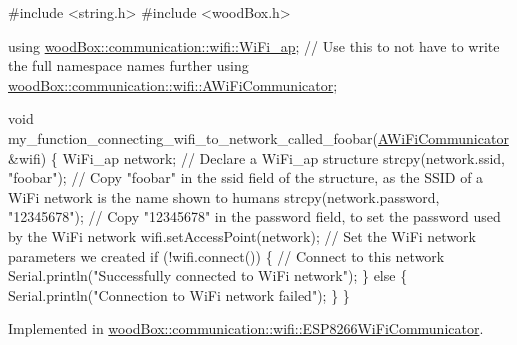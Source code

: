 \begin{DoxyCode}
\textcolor{preprocessor}{#include <string.h>}
\textcolor{preprocessor}{#include <woodBox.h>}

\textcolor{keyword}{using} \mbox{\hyperlink{structwood_box_1_1communication_1_1wifi_1_1s__wifi__access__point}{woodBox::communication::wifi::WiFi\_ap}}; \textcolor{comment}{// Use this to not have
       to write the full namespace names further}
\textcolor{keyword}{using} \mbox{\hyperlink{classwood_box_1_1communication_1_1wifi_1_1_a_wi_fi_communicator}{woodBox::communication::wifi::AWiFiCommunicator}};

\textcolor{keywordtype}{void} my\_function\_connecting\_wifi\_to\_network\_called\_foobar(\mbox{\hyperlink{classwood_box_1_1communication_1_1wifi_1_1_a_wi_fi_communicator_a9d1dc13ca9243170b04211bef2b86ed2}{AWiFiCommunicator}} &wifi) \{
  WiFi\_ap network; \textcolor{comment}{// Declare a WiFi\_ap structure}
  strcpy(network.ssid, \textcolor{stringliteral}{"foobar"}); \textcolor{comment}{// Copy "foobar" in the ssid field of the structure, as the SSID of a
       WiFi network is the name shown to humans}
  strcpy(network.password, \textcolor{stringliteral}{"12345678"}); \textcolor{comment}{// Copy "12345678" in the password field, to set the password used
       by the WiFi network}
  wifi.setAccessPoint(network); \textcolor{comment}{// Set the WiFi network parameters we created}
  \textcolor{keywordflow}{if} (!wifi.connect()) \{ \textcolor{comment}{// Connect to this network}
    Serial.println(\textcolor{stringliteral}{"Successfully connected to WiFi network"});
  \} \textcolor{keywordflow}{else} \{
    Serial.println(\textcolor{stringliteral}{"Connection to WiFi network failed"});
  \}
\}
\end{DoxyCode}
 

Implemented in \mbox{\hyperlink{classwood_box_1_1communication_1_1wifi_1_1_e_s_p8266_wi_fi_communicator_ab3e1f12a851dc3ed6eb487c39178cb6f}{wood\+Box\+::communication\+::wifi\+::\+E\+S\+P8266\+Wi\+Fi\+Communicator}}.

\mbox{\label{classwood_box_1_1communication_1_1wifi_1_1_a_wi_fi_communicator_ad8c31be391a58bfabe21c5ef99a94719}} 

